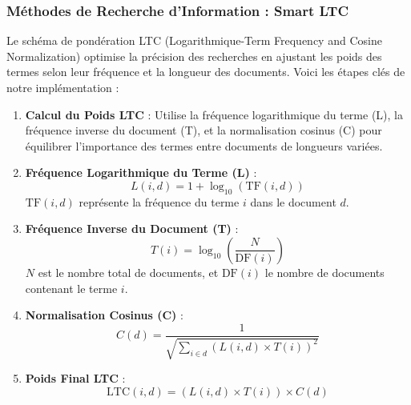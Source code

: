 \documentclass[a4paper, 12pt]{article}
\begin{document}
\newpage

\subsubsection{Méthodes de Recherche d'Information : Smart LTC}
Le schéma de pondération LTC (Logarithmique-Term Frequency and Cosine Normalization) optimise la précision des recherches en ajustant les poids des termes selon leur fréquence et la longueur des documents. Voici les étapes clés de notre implémentation :

\begin{enumerate}
\item \textbf{Calcul du Poids LTC} : Utilise la fréquence logarithmique du terme (L), la fréquence inverse du document (T), et la normalisation cosinus (C) pour équilibrer l'importance des termes entre documents de longueurs variées.

\item \textbf{Fréquence Logarithmique du Terme (L)} :
\begin{equation}
L(i, d) = 1 + \log_{10}(\text{TF}(i, d))
\end{equation}
$\text{TF}(i, d)$ représente la fréquence du terme $i$ dans le document $d$.

\item \textbf{Fréquence Inverse du Document (T)} :
\begin{equation}
T(i) = \log_{10}\left(\frac{N}{\text{DF}(i)}\right)
\end{equation}
$N$ est le nombre total de documents, et $\text{DF}(i)$ le nombre de documents contenant le terme $i$.

\item \textbf{Normalisation Cosinus (C)} :
\begin{equation}
C(d) = \frac{1}{\sqrt{\sum_{i \in d} (L(i, d) \times T(i))^2}}
\end{equation}
\item \textbf{Poids Final LTC} :
\begin{equation}
\text{LTC}(i, d) = (L(i, d) \times T(i)) \times C(d)
\end{equation}
\end{enumerate}
\end{document}
